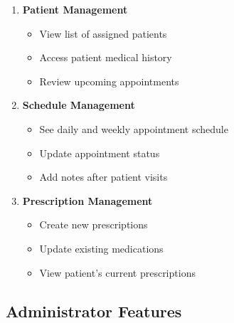 \documentclass[12pt,a4paper]{article}
\begin{document}
\begin{enumerate}
    \item 
\textbf{Patient Management}
\begin{itemize}[itemsep=0.1cm]
    \item View list of assigned patients
    \item Access patient medical history
    \item Review upcoming appointments
\end{itemize}
    \item 
\textbf{Schedule Management}
\begin{itemize}[itemsep=0.1cm]
    \item See daily and weekly appointment schedule
    \item Update appointment status
    \item Add notes after patient visits
\end{itemize}
    \item 
\textbf{Prescription Management}
\begin{itemize}[itemsep=0.1cm]
    \item Create new prescriptions
    \item Update existing medications
    \item View patient's current prescriptions
\end{itemize}
\end{enumerate}







\subsection{Administrator Features}
\end{document}
